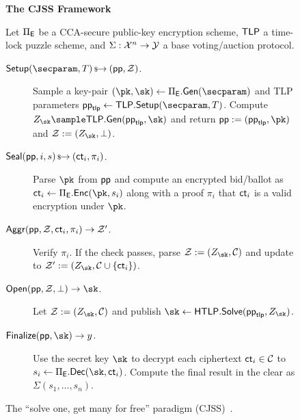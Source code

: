 \begin{figure}[ht]
\begin{mdframed}
\begin{center}
    \textbf{The CJSS Framework}
\end{center}
Let $\Pi_{\sf E}$ be a CCA-secure public-key encryption scheme, $\mathsf{TLP}$ a time-lock puzzle scheme, and $\Sigma: \mathcal{X}^n \rightarrow \mathcal{Y}$ a base voting/auction protocol.
\begin{description}
    \item[$\mathsf{Setup}(\secparam, \Ttime) \randout (\pparam, \Z)$.] Sample a key-pair $(\pk, \sk) \gets \Pi_{\sf E}.{\sf Gen}(\secparam)$ and TLP parameters $\pparam_{\sf tlp} \gets \tlp.\Setup(\secparam, \Ttime)$. Compute $Z_{\sk} \sample \tlp.\mathsf{Gen}(\pparam_{\sf tlp},\sk)$ and return $\pparam := (\pparam_{\sf tlp}, \pk)$ and $\Z := (Z_{\sk}, \perp)$.
    \item[$\mathsf{Seal}(\mathsf{pp}, i, s) \,{\mbox{\scriptsize${\$}$\normalsize}\!\!\to}\hskip2.3pt (\mathsf{ct}_i, \pi_{i})$.] Parse $\pk$ from $\mathsf{pp}$ and compute an encrypted bid/ballot as $\ct_i \gets \Pi_{\sf E}.\enc(\pk,s_i)$ along with a proof $\pi_{i}$ that $\mathsf{ct}_i$ is a valid encryption under $\pk$.
    \item[$\mathsf{Aggr}(\mathsf{pp}, \mathcal{Z}, \mathsf{ct}_{i}, \pi_{i}) \rightarrow \mathcal{Z}'$.] Verify $\pi_{i}$. If the check passes, parse $\Z := (Z_{\sk}, \mathcal{C})$ and update to $\Z' := (Z_{\sk}, \mathcal{C} \cup \{ \ct_{i} \})$.
    \item[$\Open(\pparam,\Z,\perp) \rightarrow \sk$.] Let $\Z := (Z_{\sk}, \mathcal{C})$ and publish $\sk \leftarrow \htlp.\mathsf{Solve}(\pparam_{\sf tlp},Z_{\sk})$.
    \item[$\Finalize(\pparam,\sk) \rightarrow y$.] Use the secret key $\sk$ to decrypt each ciphertext $\mathsf{ct}_i \in \mathcal{C}$ to $s_i \gets \Pi_{\sf E}.\dec(\sk, \ct_i)$. Compute the final result in the clear as $\Sigma(s_1, \dots, s_n)$.
\end{description}
\end{mdframed}
\caption{The ``solve one, get many for free'' paradigm (CJSS)~\cite{ESORICS:CJSS21}.}
\label{fig:solve_one_protocol}
\end{figure}
